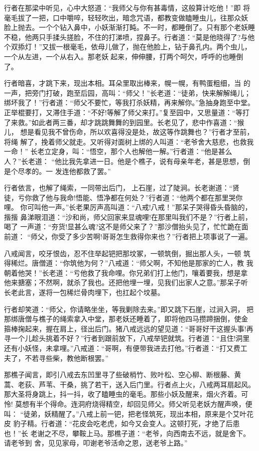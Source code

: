 行者在那梁中听见，心中大怒道：“我师父与你有甚毒情，这般算计吃他！”即
将毫毛拔了一把，口中嚼啐，轻轻吹出，暗念咒语，都教变做瞌睡虫儿，往那众妖
脸上抛去。一个个钻入鼻中，小妖渐渐打盹。不一时，都睡倒了。只有那个老妖睡
不稳，他两只手揉头搓脸，不住的打涕喷，捏鼻子。行者道：“莫是他晓得了?与他
个双掭灯！”又拔一根毫毛，依母儿做了，抛在他脸上，钻于鼻孔内。两个虫儿，
一个从左进，一个从右入。那老妖起来，伸伸腰，打两个呵欠，呼呼的也睡倒了。

行者暗喜，才跳下来，现出本相。耳朵里取出棒来，幌一幌，有鸭蛋粗细，当
的一声，把旁门打破，跑至后园，高叫：“师父！”长老道：“徒弟，快来解解绳儿；
绑坏我了！”行者道：“师父不要忙，等我打杀妖精，再来解你。”急抽身跑至中堂。
正举棍要打，又滞住手道：“不好!等解了师父来打。”复至园中，又思量道：“等打
了来救。”如此者两三番，却才跳跳舞舞的到园里。长老见了，悲中作喜道：“猴儿，
想是看见我不曾伤命，所以欢喜得没是处，故这等作跳舞也？”行者才至前，将绳
解了，挽着师父就走。又听得对面树上绑的人叫道：“老爷舍大慈悲，也救我一命！”
长老立定身，叫：“悟空，那个人也解他一解。”行者道：“他是甚么人？”长老道：
“他比我先拿进一日。他是个樵子，说有母亲年老，甚是思想，倒是个尽孝的。一
发连他都救了罢。”

行者依言，也解了绳索，一同带出后门，上石崖，过了陡涧。长老谢道：“贤
徒，亏你救了他与我命!悟能、悟净都在何处？”行者道：“他两个都在那里哭你哩。
你可叫他一声。”长老果厉声高叫道：“八戒!八戒！”那呆子哭得昏头昏脑的，揩揩
鼻涕眼泪道：“沙和尚，师父回家来显魂哩!在那里叫我们不是？”行者上前，喝了
一声道：“夯货!显甚么魂?这不是师父来了？”那沙僧抬头见了，忙忙跪在面前道：
“师父，你受了多少苦啊!哥哥怎生救得你来也？”行者把上项事说了一遍。

八戒闻言，咬牙恨齿，忍不住举起钯把那坟冢，一顿筑倒，掘出那人头，一顿
筑得稀烂。唐僧道：“你筑他为何？”八戒道：“师父啊，不知他是那家的亡人，教
我朝着他哭！”长老道：“亏他救了我命哩。你兄弟们打上他门，嚷着要我，想是拿
他来搪塞；不然啊，就杀了我也。还把他埋一埋，见我们出家人之意。”那呆子听
长老此言，遂将一包稀烂骨肉埋下，也扛起个坟墓。

行者却笑道：“师父，你请略坐坐，等我剿除去来。”即又跳下石崖，过涧入洞，
把那绑唐僧与樵子的绳索拿入中堂，那老妖还睡着了，即将他四马攒蹄捆倒，使金
箍棒掬起来，握在肩上，径出后门。猪八戒远远的望见道：“哥哥好干这握头事!再
寻一个儿趁头挑着不好？”行者到跟前放下，八戒举钯就筑。行者道：“且住!洞里
还有小妖怪，未拿哩。”八戒道：“哥啊，有便带我进去打他。”行者道：“打又费工
夫了，不若寻些柴，教他断根罢。”

那樵子闻言，即引八戒去东凹里寻了些破梢竹、败叶松、空心柳、断根藤、黄
蒿、老荻、芦苇、干桑，挑了若干，送入后门里。行者点上火，八戒两耳扇起风。
那大圣将身跳上，抖一抖，收了瞌睡虫的毫毛。那些小妖及醒来，烟火齐着。可怜!
莫想有半个得命。连洞府烧得精空，却回见师父。师父听见老妖方醒声唤，便叫：
“徒弟，妖精醒了。”八戒上前一钯，把老怪筑死，现出本相，原来是个艾叶花皮
豹子精。行者道：“花皮会吃老虎，如今又会变人。这顿打死，才绝了后患也！”长
老谢之不尽，攀鞍上马。那樵子道：“老爷，向西南去不远，就是舍下。请老爷到
舍，见见家母，叩谢老爷活命之恩，送老爷上路。”

